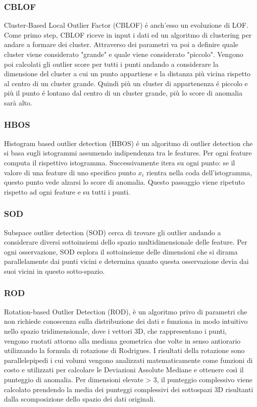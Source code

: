 \subsubsection{CBLOF}
Cluster-Based Local Outlier Factor (CBLOF) é anch'esso un evoluzione di LOF.
Come primo step, CBLOF riceve in input i dati ed un algoritmo di clustering per andare a formare dei cluster. Attraverso dei parametri va poi a definire quale cluster viene considerato "grande" e quale viene considerato "piccolo". Vengono poi calcolati gli outlier score per tutti i punti andando a considerare la dimensione del cluster a cui un punto appartiene e la distanza più vicina rispetto al centro di un cluster grande. Quindi più un cluster di appartenenza é piccolo e più il punto é lontano dal centro di un cluster grande, più lo score di anomalia sarà alto. 

\subsubsection{HBOS}
Histogram based outlier detection (HBOS) é un algoritmo di outlier detection che si basa sugli istogrammi assumendo indipendenza tra le features. Per ogni feature computa il rispettivo istogramma. Successivamente itera su ogni punto: se il valore di una feature di uno specifico punto $x_i$ rientra nella coda dell'istogramma, questo punto vede alzarsi lo score di anomalia. Questo passaggio viene ripetuto rispetto ad ogni feature e su tutti i punti.

\subsubsection{SOD}
Subspace outlier detection (SOD) cerca di trovare gli outlier andando a considerare diversi sottoinsiemi dello spazio multidimensionale delle feature. Per ogni osservazione, SOD esplora il sottoinsieme delle dimensioni che si dirama parallelamente dai punti vicini e determina quanto questa osservazione devia dai suoi vicini in questo sotto-spazio. 

\subsubsection{ROD}
Rotation-based Outlier Detection (ROD),  è un algoritmo privo di parametri che non richiede conoscenza sulla distribuzione dei dati e funziona in modo intuitivo nello spazio tridimensionale, dove i vettori 3D, che rappresentano i punti, vengono ruotati attorno alla mediana geometrica due volte in senso antiorario utilizzando la formula di rotazione di Rodrigues. I risultati della rotazione sono parallelepipedi i cui volumi vengono analizzati matematicamente come funzioni di costo e utilizzati per calcolare le Deviazioni Assolute Mediane e ottenere così il punteggio di anomalia. Per dimensioni elevate > 3, il punteggio complessivo viene calcolato prendendo la media dei punteggi complessivi dei sottospazi 3D risultanti dalla scomposizione dello spazio dei dati originali.


